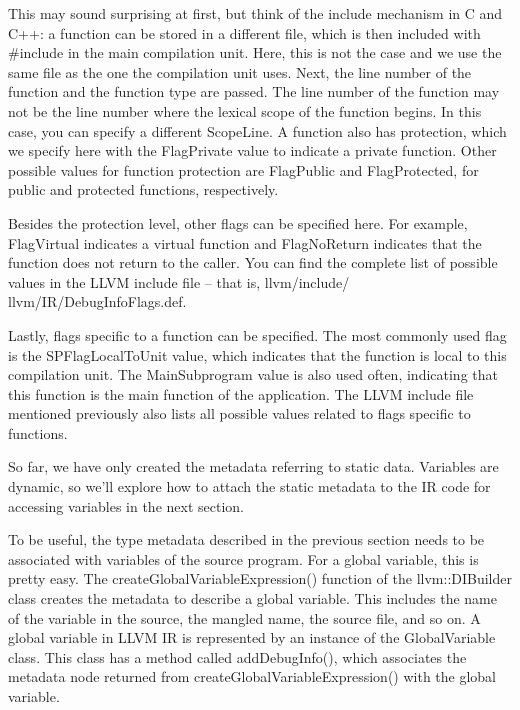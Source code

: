 This may sound surprising at first, but think of the include mechanism in C and C++: a function can be stored in a different file, which is then included with \#include in the main compilation unit. Here, this is not the case and we use the same file as the one the compilation unit uses. Next, the line number of the function and the function type are passed. The line number of the function may not be the line number where the lexical scope of the function begins. In this case, you can specify a different ScopeLine. A function also has protection, which we specify here with the FlagPrivate value to indicate a private function. Other possible values for function protection are FlagPublic and FlagProtected, for public and protected functions, respectively.

Besides the protection level, other flags can be specified here. For example, FlagVirtual indicates a virtual function and FlagNoReturn indicates that the function does not return to the caller. You can find the complete list of possible values in the LLVM include file – that is, llvm/include/ llvm/IR/DebugInfoFlags.def.

Lastly, flags specific to a function can be specified. The most commonly used flag is the SPFlagLocalToUnit value, which indicates that the function is local to this compilation unit.
The MainSubprogram value is also used often, indicating that this function is the main function of the application. The LLVM include file mentioned previously also lists all possible values related to flags specific to functions.

So far, we have only created the metadata referring to static data. Variables are dynamic, so we’ll explore how to attach the static metadata to the IR code for accessing variables in the next section.


To be useful, the type metadata described in the previous section needs to be associated with variables of the source program. For a global variable, this is pretty easy. The createGlobalVariableExpression() function of the llvm::DIBuilder class creates the metadata to describe a global variable. This includes the name of the variable in the source, the mangled name, the source file, and so on. A global variable in LLVM IR is represented by an instance of the GlobalVariable class. This class has a method called addDebugInfo(), which associates the metadata node returned from createGlobalVariableExpression() with the global variable.

